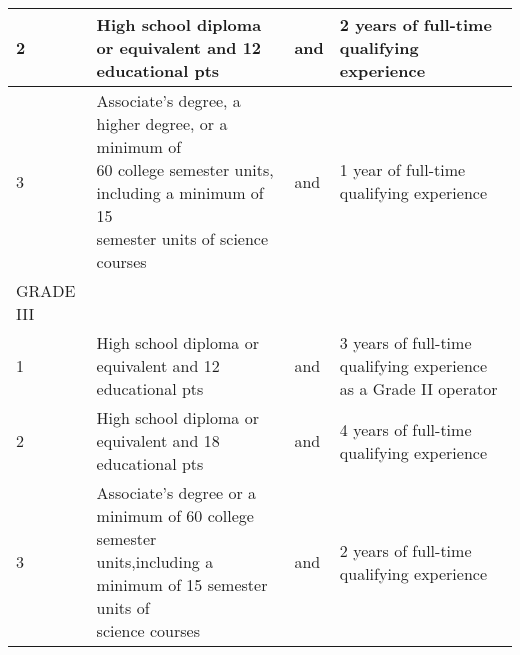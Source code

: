 \begin{table}[H]
\begin{tabular}{|l|p{6.5cm}|l|p{6.5cm}|}
2         & High  school  diploma    or  equivalent  and    12 educational pts                                                                                                                                                                                                                         & and & 2    years    of      full-time    qualifying   experience                                      \\ \hline
3         & \makecell[l]{Associate’s  degree,  a    higher  degree,  or  a minimum   of\\   60  college   semester   units, including a minimum of 15\\semester units of science courses                                                                                                                          } & and & 1     year     of       full-time     qualifying   experience                                   \\ \hline
GRADE III &                                                                                                                                                                                                                                                                                               &     &                                                                                                 \\ \hline
1         & High  school  diploma    or  equivalent  and    12 educational pts                                                                                                                                                                                                                         & and & 3    years    of      full-time    qualifying   experience as a Grade II operator               \\ \hline
2         & High  school  diploma    or  equivalent  and    18 educational pts                                                                                                                                                                                                                         & and & 4    years    of      full-time    qualifying   experience                                      \\ \hline
3         & \makecell[l]{Associate’s  degree  or    a  minimum   of     60 college semester\\ units,including a minimum of 15 semester units of\\science courses                                                                                                                                                      } & and & 2    years    of      full-time    qualifying   experience                                      \\ \hline

\end{tabular}
\end{table}
